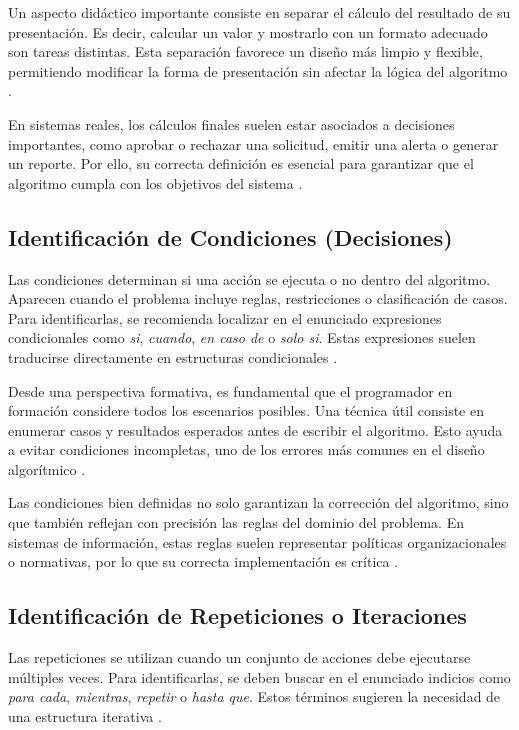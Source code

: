 \documentclass[12pt,twoside]{book}
\begin{document}
						Un aspecto didáctico importante consiste en separar el cálculo del resultado de su presentación. Es decir, calcular un valor y mostrarlo con un formato adecuado son tareas distintas. Esta separación favorece un diseño más limpio y flexible, permitiendo modificar la forma de presentación sin afectar la lógica del algoritmo \cite{Pressman2019Software}.
						
						En sistemas reales, los cálculos finales suelen estar asociados a decisiones importantes, como aprobar o rechazar una solicitud, emitir una alerta o generar un reporte. Por ello, su correcta definición es esencial para garantizar que el algoritmo cumpla con los objetivos del sistema \cite{Sommerville2015Software}.
						
					\subsection{Identificación de Condiciones (Decisiones)}
						\noindent
						Las condiciones determinan si una acción se ejecuta o no dentro del algoritmo. Aparecen cuando el problema incluye reglas, restricciones o clasificación de casos. Para identificarlas, se recomienda localizar en el enunciado expresiones condicionales como \textit{si}, \textit{cuando}, \textit{en caso de} o \textit{solo si}. Estas expresiones suelen traducirse directamente en estructuras condicionales \cite{Halterman2018Fundamentals}.
						
						Desde una perspectiva formativa, es fundamental que el programador en formación considere todos los escenarios posibles. Una técnica útil consiste en enumerar casos y resultados esperados antes de escribir el algoritmo. Esto ayuda a evitar condiciones incompletas, uno de los errores más comunes en el diseño algorítmico \cite{Gaddis2022Starting}.
						
						Las condiciones bien definidas no solo garantizan la corrección del algoritmo, sino que también reflejan con precisión las reglas del dominio del problema. En sistemas de información, estas reglas suelen representar políticas organizacionales o normativas, por lo que su correcta implementación es crítica \cite{Sommerville2015Software}.
						
					\subsection{Identificación de Repeticiones o Iteraciones}
						\noindent
						Las repeticiones se utilizan cuando un conjunto de acciones debe ejecutarse múltiples veces. Para identificarlas, se deben buscar en el enunciado indicios como \textit{para cada}, \textit{mientras}, \textit{repetir} o \textit{hasta que}. Estos términos sugieren la necesidad de una estructura iterativa \cite{Halterman2018Fundamentals}.
						
\end{document}

